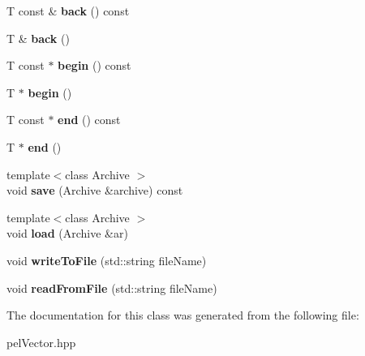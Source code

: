 \begin{DoxyCompactItemize}
\item 
\hypertarget{classpel_1_1Vector_a283dd63d97b1e626a6f6fc32d4cc9fd5}{}T const \& {\bfseries back} () const \label{classpel_1_1Vector_a283dd63d97b1e626a6f6fc32d4cc9fd5}

\item 
\hypertarget{classpel_1_1Vector_ae7f8cc3c6afb0d650324943575a73ea9}{}T \& {\bfseries back} ()\label{classpel_1_1Vector_ae7f8cc3c6afb0d650324943575a73ea9}

\item 
\hypertarget{classpel_1_1Vector_ad9bce5db8f392bbe3614b7516bd0fba5}{}T const $\ast$ {\bfseries begin} () const \label{classpel_1_1Vector_ad9bce5db8f392bbe3614b7516bd0fba5}

\item 
\hypertarget{classpel_1_1Vector_a04166b80ef6b5fc33d8afa5d6aeaca07}{}T $\ast$ {\bfseries begin} ()\label{classpel_1_1Vector_a04166b80ef6b5fc33d8afa5d6aeaca07}

\item 
\hypertarget{classpel_1_1Vector_a1fd2729b6bcc3d90ba881277ba3bd17f}{}T const $\ast$ {\bfseries end} () const \label{classpel_1_1Vector_a1fd2729b6bcc3d90ba881277ba3bd17f}

\item 
\hypertarget{classpel_1_1Vector_a17255b938ee37228a7cc35c07e23d52f}{}T $\ast$ {\bfseries end} ()\label{classpel_1_1Vector_a17255b938ee37228a7cc35c07e23d52f}

\item 
\hypertarget{classpel_1_1Vector_aaee3091869f30a2b4db2774100647933}{}{\footnotesize template$<$class Archive $>$ }\\void {\bfseries save} (Archive \&archive) const \label{classpel_1_1Vector_aaee3091869f30a2b4db2774100647933}

\item 
\hypertarget{classpel_1_1Vector_a531d1f8c5149767ad545c37fe887088b}{}{\footnotesize template$<$class Archive $>$ }\\void {\bfseries load} (Archive \&ar)\label{classpel_1_1Vector_a531d1f8c5149767ad545c37fe887088b}

\item 
\hypertarget{classpel_1_1Vector_a6481271f76ef19534791659c56a9bf10}{}void {\bfseries write\+To\+File} (std\+::string file\+Name)\label{classpel_1_1Vector_a6481271f76ef19534791659c56a9bf10}

\item 
\hypertarget{classpel_1_1Vector_a24212a4bad6ba9c88eb4eee2397dfd84}{}void {\bfseries read\+From\+File} (std\+::string file\+Name)\label{classpel_1_1Vector_a24212a4bad6ba9c88eb4eee2397dfd84}

\end{DoxyCompactItemize}


The documentation for this class was generated from the following file\+:\begin{DoxyCompactItemize}
\item 
pel\+Vector.\+hpp\end{DoxyCompactItemize}
